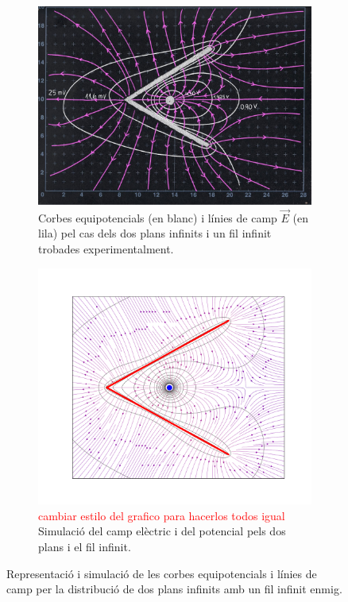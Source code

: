 \documentclass[a4paper,10.5pt]{report}
\begin{document}
\begin{figure}[h]
	\centering
	\begin{subfigure}{0.49\linewidth}
		\centering
		\includegraphics[width=\linewidth]{confinventJS}
		\caption{Corbes equipotencials (en blanc) i línies de camp $\vec{E}$ (en lila) pel cas dels dos plans infinits i un fil infinit trobades experimentalment.}
		\label{fig:1.4a}
	\end{subfigure}
	\hfill
	\begin{subfigure}{0.49\linewidth}
		\centering
		\includegraphics[width=\linewidth]{figplacarara}
		\caption{\textcolor{red}{cambiar estilo del grafico para hacerlos todos igual} Simulació del camp elèctric i del potencial pels dos plans i el fil infinit.}
		\label{fig:1.4b}
	\end{subfigure}
	\caption{Representació i simulació de les corbes equipotencials i línies de camp per la distribució de dos plans infinits amb un fil infinit enmig.}
	\label{fig:1.4}
\end{figure}
\end{document}
